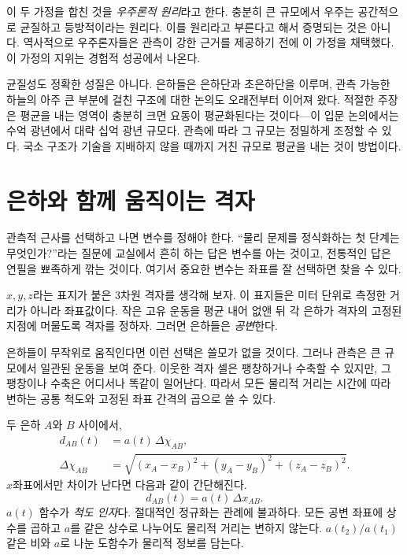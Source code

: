 이 두 가정을 합친 것을 \emph{우주론적 원리}라고 한다. 충분히 큰 규모에서 우주는 공간적으로 균질하고 등방적이라는 원리다. 이를 원리라고 부른다고 해서 증명되는 것은 아니다. 역사적으로 우주론자들은 관측이 강한 근거를 제공하기 전에 이 가정을 채택했다. 이 가정의 지위는 경험적 성공에서 나온다.

균질성도 정확한 성질은 아니다. 은하들은 은하단과 초은하단을 이루며, 관측 가능한 하늘의 아주 큰 부분에 걸친 구조에 대한 논의도 오래전부터 이어져 왔다. 적절한 주장은 평균을 내는 영역이 충분히 크면 요동이 평균화된다는 것이다---이 입문 논의에서는 수억 광년에서 대략 십억 광년 규모다. 관측에 따라 그 규모는 정밀하게 조정할 수 있다. 국소 구조가 기술을 지배하지 않을 때까지 거친 규모로 평균을 내는 것이 방법이다.

\begin{classroomqa}\end{classroomqa}

\section{은하와 함께 움직이는 격자}

관측적 근사를 선택하고 나면 변수를 정해야 한다. “물리 문제를 정식화하는 첫 단계는 무엇인가?”라는 질문에 교실에서 흔히 하는 답은 변수를 아는 것이고, 전통적인 답은 연필을 뾰족하게 깎는 것이다. 여기서 중요한 변수는 좌표를 잘 선택하면 찾을 수 있다.

\(x,y,z\)라는 표지가 붙은 3차원 격자를 생각해 보자. 이 표지들은 미터 단위로 측정한 거리가 아니라 좌표값이다. 작은 고유 운동을 평균 내어 없앤 뒤 각 은하가 격자의 고정된 지점에 머물도록 격자를 정하자. 그러면 은하들은 \emph{공변}한다.

은하들이 무작위로 움직인다면 이런 선택은 쓸모가 없을 것이다. 그러나 관측은 큰 규모에서 일관된 운동을 보여 준다. 이웃한 격자 셀은 팽창하거나 수축할 수 있지만, 그 팽창이나 수축은 어디서나 똑같이 일어난다. 따라서 모든 물리적 거리는 시간에 따라 변하는 공통 척도와 고정된 좌표 간격의 곱으로 쓸 수 있다.

두 은하 \(A\)와 \(B\) 사이에서, \begin{equation}
\begin{aligned}
d_{AB}(t)&=a(t)\,\Delta\chi_{AB},\\
\Delta\chi_{AB}
&=\sqrt{(x_A-x_B)^2+(y_A-y_B)^2+(z_A-z_B)^2}.
\end{aligned}
\label{eq:c01-physical-distance}
\end{equation}\(x\)좌표에서만 차이가 난다면 다음과 같이 간단해진다. \begin{equation}
d_{AB}(t)=a(t)\,\Delta x_{AB}.
\end{equation}\(a(t)\) 함수가 \emph{척도 인자}다. 절대적인 정규화는 관례에 불과하다. 모든 공변 좌표에 상수를 곱하고 \(a\)를 같은 상수로 나누어도 물리적 거리는 변하지 않는다. \(a(t_2)/a(t_1)\) 같은 비와 \(a\)로 나눈 도함수가 물리적 정보를 담는다.

